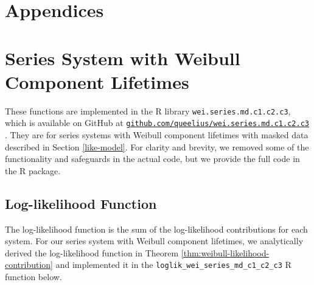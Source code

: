 \documentclass[
]{article}
\theoremstyle{definition}
\theoremstyle{plain}
\theoremstyle{definition}
\theoremstyle{definition}
\theoremstyle{definition}
\theoremstyle{definition}
\theoremstyle{remark}
\begin{document}
\hypertarget{appendices}{%
\section*{Appendices}\label{appendices}}

\hypertarget{appendix-appendix}{%
\appendix}


\hypertarget{series-system-with-weibull-component-lifetimes}{%
\section{Series System with Weibull Component Lifetimes}\label{series-system-with-weibull-component-lifetimes}}

These functions are implemented in the R library \texttt{wei.series.md.c1.c2.c3}, which
is available on GitHub at
\href{https://github.com/queelius/wei.series.md.c1.c2.c3}{\texttt{github.com/queelius/wei.series.md.c1.c2.c3}}
\citep{towell2023weibull}.
They are for series systems with Weibull component lifetimes with masked data
described in Section \ref{like-model}. For clarity and brevity, we
removed some of the functionality and safeguards in the actual code, but we
provide the full code in the R package.

\hypertarget{app-weibull-loglik-r}{%
\subsection{Log-likelihood Function}\label{app-weibull-loglik-r}}

The log-likelihood function is the sum of the log-likelihood contributions for
each system. For our series system with Weibull component lifetimes, we
analytically derived the log-likelihood function in Theorem
\ref{thm:weibull-likelihood-contribution} and implemented it in the
\texttt{loglik\_wei\_series\_md\_c1\_c2\_c3} R function below.
\end{document}
